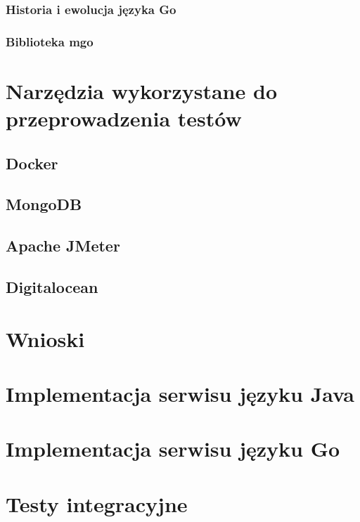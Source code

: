 \documentclass[a4paper,12pt,twoside,openany]{report}
\begin{document}
\subsection{Historia i ewolucja języka Go}
\subsection{Biblioteka mgo}

\chapter{Narzędzia wykorzystane do przeprowadzenia testów}
\section{Docker}
\section{MongoDB}
\section{Apache JMeter}
\section{Digitalocean}





\chapter{Wnioski}

\appendix
\chapter{Implementacja serwisu języku Java}
\chapter{Implementacja serwisu języku Go}
\chapter{Testy integracyjne}

\begin{thebibliography}{99}

\end{thebibliography}

\zakonczenie  %
\end{document}
